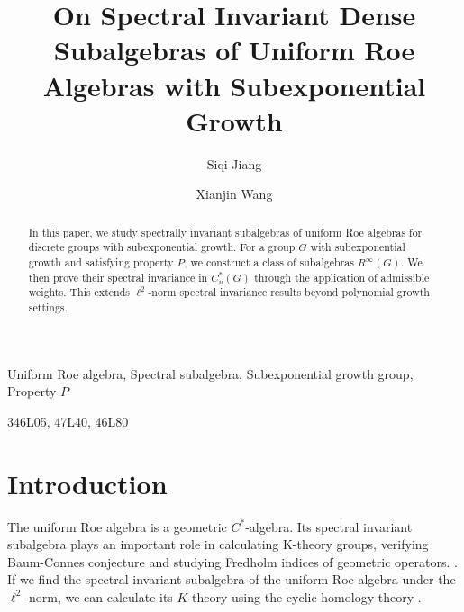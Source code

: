 \documentclass[preprint,11pt]{elsarticle}
\numberwithin{equation}{section}
\begin{document}
	
	\begin{frontmatter}
		
		
		
		\title{On Spectral Invariant Dense Subalgebras of Uniform Roe Algebras with Subexponential Growth}
		
		\author[a]{Siqi Jiang} %
		
		\author[b]{Xianjin Wang }
		
		
		\address[a]{College of science,
			Civil Aviation Flight University of China,
			Guang Han 618307, P. R. China}
		
		\address[b]{College of Mathematics and Statistics
			Chongqing University, (at Huxi Campus),
			Key Laboratory of Nonlinear Analysis and its Applications (Chongqing University),
			Ministry of Education,
			Chongqing 401331, P. R. China.}
		
		
		\begin{abstract}
			In this paper, we study spectrally invariant subalgebras of uniform Roe algebras for discrete groups with subexponential growth. For a group \( G \) with subexponential growth and satisfying property \( P \), we construct a class of subalgebras \( R^{\infty}(G) \). We then prove their spectral invariance in \( C_u^*(G) \) through the application of admissible weights.  This extends \(\ell^2\)-norm spectral invariance results beyond polynomial growth settings.
		\end{abstract}
		\begin{keyword}
			Uniform Roe algebra, Spectral subalgebra, Subexponential  growth group, Property \( P \)
			
			\MSC[2020] 346L05, 47L40, 46L80 
		\end{keyword}
		
		
	\end{frontmatter}
	
	\section{Introduction } 
	The uniform Roe algebra is a geometric $C^{*}$-algebra. Its spectral invariant subalgebra plays an important role in calculating K-theory groups, verifying Baum-Connes conjecture and studying Fredholm indices of geometric operators. \cite{GWY2008,NVG2002,NJ2000,1Y1995}.
	If we find the spectral invariant subalgebra of the uniform Roe algebra under the $\ell^2$-norm, we can calculate its $K$-theory using the cyclic homology theory  \cite{A1985}.
	
\end{document}
